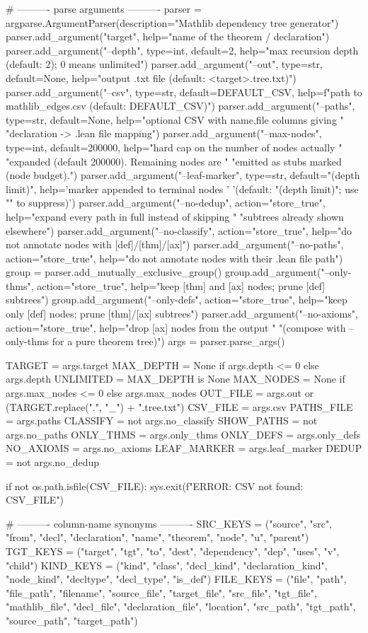 \documentclass[11pt,reqno]{amsart}
\begin{document}
\begin{verbatimbox}
# ---------- parse arguments ----------
parser = argparse.ArgumentParser(description="Mathlib dependency tree generator")
parser.add_argument("target", help="name of the theorem / declaration")
parser.add_argument("--depth", type=int, default=2,
help="max recursion depth (default: 2); 0 means unlimited")
parser.add_argument("--out", type=str, default=None,
help="output .txt file (default: <target>.tree.txt)")
parser.add_argument("--csv", type=str, default=DEFAULT_CSV,
help=f"path to mathlib_edges.csv (default: {DEFAULT_CSV})")
parser.add_argument("--paths", type=str, default=None,
help="optional CSV with name,file columns giving "
"declaration -> .lean file mapping")
parser.add_argument("--max-nodes", type=int, default=200000,
help="hard cap on the number of nodes actually "
"expanded (default 200000). Remaining nodes are "
"emitted as stubs marked (node budget).")
parser.add_argument("--leaf-marker", type=str, default="(depth limit)",
help='marker appended to terminal nodes '
'(default: "(depth limit)"; use "" to suppress)')
parser.add_argument("--no-dedup", action="store_true",
help="expand every path in full instead of skipping "
"subtrees already shown elsewhere")
parser.add_argument("--no-classify", action="store_true",
help="do not annotate nodes with [def]/[thm]/[ax]")
parser.add_argument("--no-paths", action="store_true",
help="do not annotate nodes with their .lean file path")
group = parser.add_mutually_exclusive_group()
group.add_argument("--only-thms", action="store_true",
help="keep [thm] and [ax] nodes; prune [def] subtrees")
group.add_argument("--only-defs", action="store_true",
help="keep only [def] nodes; prune [thm]/[ax] subtrees")
parser.add_argument("--no-axioms", action="store_true",
help="drop [ax] nodes from the output "
"(compose with --only-thms for a pure theorem tree)")
args = parser.parse_args()

TARGET = args.target
MAX_DEPTH = None if args.depth <= 0 else args.depth
UNLIMITED = MAX_DEPTH is None
MAX_NODES = None if args.max_nodes <= 0 else args.max_nodes
OUT_FILE = args.out or (TARGET.replace(".", "_") + ".tree.txt")
CSV_FILE = args.csv
PATHS_FILE = args.paths
CLASSIFY = not args.no_classify
SHOW_PATHS = not args.no_paths
ONLY_THMS = args.only_thms
ONLY_DEFS = args.only_defs
NO_AXIOMS = args.no_axioms
LEAF_MARKER = args.leaf_marker
DEDUP = not args.no_dedup

if not os.path.isfile(CSV_FILE):
sys.exit(f"ERROR: CSV not found: {CSV_FILE}")

# ---------- column-name synonyms ----------
SRC_KEYS  = ("source", "src", "from", "decl", "declaration", "name",
"theorem", "node", "u", "parent")
TGT_KEYS  = ("target", "tgt", "to", "dest", "dependency", "dep",
"uses", "v", "child")
KIND_KEYS = ("kind", "class", "decl_kind", "declaration_kind",
"node_kind", "decltype", "decl_type", "is_def")
FILE_KEYS = ("file", "path", "file_path", "filename", "source_file",
"target_file", "src_file", "tgt_file", "mathlib_file",
"decl_file", "declaration_file", "location", "src_path",
"tgt_path", "source_path", "target_path")


\end{verbatimbox}
\end{document}
